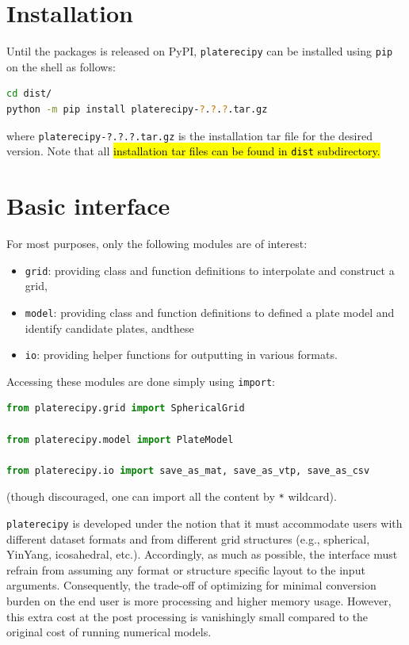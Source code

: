 \documentclass[12pt,letterpaper]{article}
\begin{document}
\section{Installation}
Until the packages is released on PyPI, \texttt{platerecipy} can be installed using 
\texttt{pip} on the shell as follows:
\begin{lstlisting}[language=bash]
cd dist/
python -m pip install platerecipy-?.?.?.tar.gz
\end{lstlisting}
where \texttt{platerecipy-?.?.?.tar.gz} is the installation tar file for the desired 
version. Note that all \hl{installation tar files can be found in \texttt{dist} 
subdirectory.}

\section{Basic interface}
For most purposes, only the following modules are of interest:
\begin{itemize}
	\item \texttt{grid}: providing class and function definitions to interpolate and construct a grid,
	\item \texttt{model}: providing class and function definitions to defined a plate model and identify candidate plates, andthese
	\item \texttt{io}: providing helper functions for outputting in various formats.
\end{itemize}
Accessing these modules are done simply using \texttt{import}:
\begin{lstlisting}[language=Python]
from platerecipy.grid import SphericalGrid

from platerecipy.model import PlateModel

from platerecipy.io import save_as_mat, save_as_vtp, save_as_csv
\end{lstlisting}
(though discouraged, one can import all the content by \texttt{*} wildcard).

\texttt{platerecipy} is developed under the notion that it must accommodate users 
with different dataset formats and from different grid structures (e.g., spherical, 
YinYang, icosahedral, etc.). Accordingly, as much as possible, the interface
must refrain from assuming any format or structure specific layout to the input 
arguments. Consequently, the trade-off of optimizing for minimal conversion burden 
on the end user is more processing and higher memory usage. However, this extra 
cost at the post processing is vanishingly small compared to the original cost of 
running numerical models. 
\end{document}
